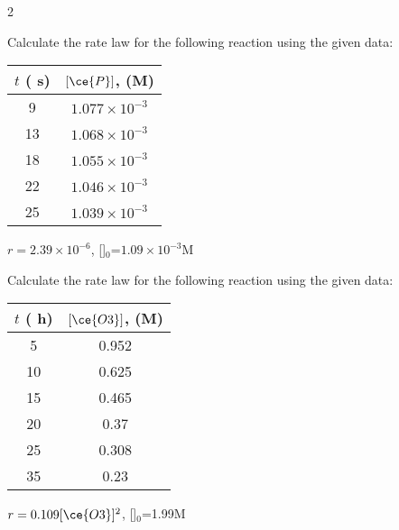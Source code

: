 \documentclass[main.tex]{subfiles}
\begin{document}
\begin{multicols*}{2}
\begin{question}[ID=\the\value{numA}]
Calculate the rate law for the following reaction using the given data:
\begin{center}\begin{tabular}[t]{   c  c   }
\toprule
  $t$ ( s)	&$[\ce{P}]$, (M) \\
\midrule
9&$1.077\times10^{-3}$\\
13&$1.068\times10^{-3}$\\
18&$1.055\times10^{-3}$\\
22&$1.046\times10^{-3}$\\
25&$1.039\times10^{-3}$\\
\bottomrule
\end{tabular}\end{center}
\end{question}
\begin{solution}
 $r=2.39\times 10^{-6}$, []$_0$=$1.09\times 10^{-3}$M
\hspace{0.1cm}\end{solution}%




\begin{question}[ID=\the\value{numA}]
Calculate the rate law for the following reaction using the given data:  
\begin{center}\begin{tabular}[t]{   c  c   }
\toprule
  $t$ ( h)	&$[\ce{O3}]$, (M) \\
\midrule
5&	0.952\\
10&	0.625\\
15&	0.465\\
20&	0.37\\
25&	0.308\\
35&0.23\\
\bottomrule
\end{tabular}\end{center}
\end{question}
\begin{solution}
 $r=0.109[\ce{O3}]^2$, []$_0$=1.99M
\hspace{0.1cm}\end{solution}%

	
	

\end{multicols*}
\end{document}
